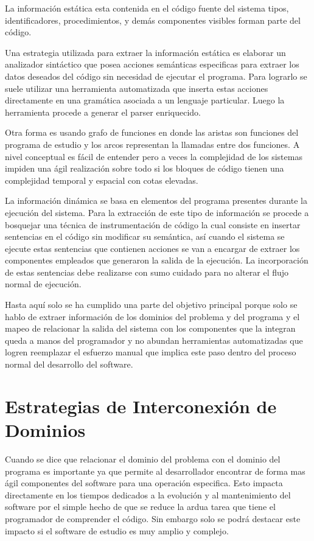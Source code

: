 \documentclass[12pt]{report}
\begin{document}
La información estática esta contenida en el código fuente del sistema 
tipos, identificadores, procedimientos, y demás componentes visibles forman parte del código. 

Una estrategia utilizada para extraer la información estática es elaborar un analizador sintáctico que posea acciones semánticas especificas para extraer los datos deseados del código sin necesidad de ejecutar el programa. Para lograrlo se suele utilizar una herramienta automatizada que inserta estas acciones directamente en una gramática asociada a un lenguaje particular. Luego la herramienta procede a generar el parser enriquecido.

Otra forma es usando grafo de funciones en donde las aristas son funciones del programa de estudio y los arcos representan la llamadas entre dos funciones. A nivel conceptual es fácil de entender pero a veces la complejidad de los sistemas impiden una ágil realización sobre todo si los bloques de código tienen una complejidad temporal y espacial con cotas elevadas.

La información dinámica se basa en elementos del programa presentes durante la ejecución del sistema. Para la extracción de este tipo de información se procede a bosquejar una técnica de instrumentación de código la cual consiste en insertar sentencias en el código sin modificar su semántica, así cuando el sistema se ejecute estas sentencias que contienen acciones se van a encargar de extraer los componentes empleados que generaron la salida de la ejecución.
La incorporación de estas sentencias debe realizarse con sumo cuidado para no alterar el flujo normal de ejecución.

Hasta aquí solo se ha cumplido una parte del objetivo principal porque solo se hablo de extraer información de los dominios del problema y del programa y el mapeo de relacionar la salida del sistema con los componentes que la integran queda a manos del programador y no abundan herramientas automatizadas que logren reemplazar el esfuerzo manual que implica este paso dentro del proceso normal del desarrollo del software.

\section{Estrategias de Interconexión de \\Dominios}

Cuando se dice que relacionar el dominio del problema con el dominio del programa es importante ya que permite al desarrollador encontrar de forma  mas ágil componentes del software para una operación especifica. Esto impacta directamente en los tiempos dedicados a la evolución y al mantenimiento del software por el simple hecho de que se reduce la ardua tarea que tiene el programador de comprender el código.
Sin embargo solo se podrá destacar este impacto si el software de estudio es muy amplio y complejo.
\end{document}
